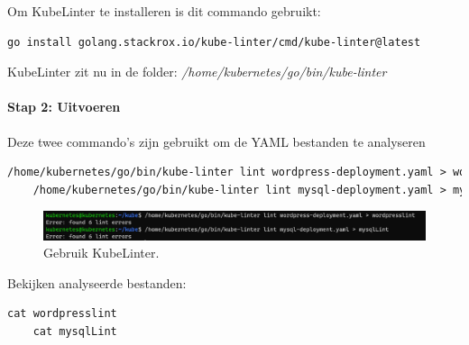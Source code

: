 Om KubeLinter te installeren is dit commando gebruikt:
\begin{lstlisting}[language=tex, caption={Installeer KubeLinter}]
go install golang.stackrox.io/kube-linter/cmd/kube-linter@latest
\end{lstlisting}

KubeLinter zit nu in de folder: \textit{/home/kubernetes/go/bin/kube-linter}

\paragraph{Stap 2: Uitvoeren}

Deze twee commando's zijn gebruikt om de YAML bestanden te analyseren

\begin{lstlisting}[language=tex, caption={Analyseer YAML bestanden}]
    /home/kubernetes/go/bin/kube-linter lint wordpress-deployment.yaml > wordpresslint
    /home/kubernetes/go/bin/kube-linter lint mysql-deployment.yaml > mysqlLint
\end{lstlisting}


\begin{flushleft}
    \begin{figure}[h]
        \includegraphics[width=.80\textwidth]{graphics/kubeLinterLinting.png}
        \caption{\label{fig:GebruikKubeLinter}Gebruik KubeLinter.}
    \end{figure} 
\end{flushleft}

Bekijken analyseerde bestanden:
\begin{lstlisting}[language=tex, caption={Bekijk analyse}]
    cat wordpresslint
    cat mysqlLint
\end{lstlisting}

